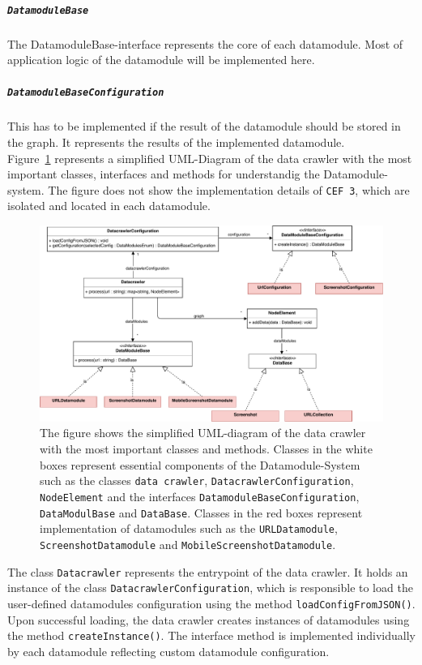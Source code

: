 \subparagraph*{\texttt{DatamoduleBase}}
	The DatamoduleBase-interface represents the core of each datamodule. Most of application logic of the datamodule will be implemented here.


\subparagraph*{\texttt{DatamoduleBaseConfiguration}}
	This has to be implemented if the result of the datamodule should be stored in the graph. It represents the results of the implemented datamodule.\\
	
Figure~\ref{datacrawler_uml_diagram} represents a simplified UML-Diagram of the data crawler with the most important classes, interfaces and methods for understandig the Datamodule-system. The figure does not show the implementation details of \texttt{CEF 3}, which are isolated and located in each datamodule.

\begin{figure}
	\centering
	\includegraphics[scale=0.5]{resources/datacrawler_uml_diagram}
	\caption[UML-Diagram of the data crawler]{The figure shows the simplified UML-diagram of the data crawler with the most important classes and methods. Classes in the white boxes represent essential components of the Datamodule-System such as the classes \texttt{data crawler}, \texttt{DatacrawlerConfiguration}, \texttt{NodeElement} and the interfaces \texttt{DatamoduleBaseConfiguration}, \texttt{DataModulBase} and \texttt{DataBase}. Classes in the red boxes represent implementation of datamodules such as the \texttt{URLDatamodule}, \texttt{ScreenshotDatamodule} and \texttt{MobileScreenshotDatamodule}.}
	\label{datacrawler_uml_diagram}
\end{figure}

The class \texttt{Datacrawler} represents the entrypoint of the data crawler. It holds an instance of the class \texttt{DatacrawlerConfiguration}, which is responsible to load the user-defined datamodules configuration using the method \texttt{loadConfigFromJSON()}. Upon successful loading, the data crawler creates instances of datamodules using the method \texttt{createInstance()}. The interface method is implemented individually by each datamodule reflecting custom datamodule configuration. 

